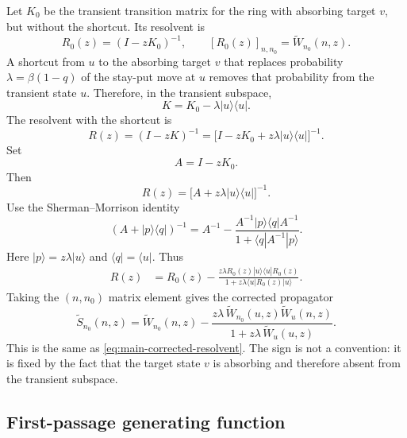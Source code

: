 \documentclass[11pt]{article}
\newcommand{\wt}{\widetilde}
\begin{document}
Let $K_0$ be the transient transition matrix for the ring with absorbing target $v$, but without
the shortcut.  Its resolvent is
\begin{equation}
  R_0(z)=(I-zK_0)^{-1},
  \qquad
  [R_0(z)]_{n,n_0}=\wt W_{n_0}(n,z).
\end{equation}
A shortcut from $u$ to the absorbing target $v$ that replaces probability
$\lambda=\beta(1-q)$ of the stay-put move at $u$ removes that probability from the transient
state $u$.  Therefore, in the transient subspace,
\begin{equation}
  K=K_0-\lambda |u\rangle\langle u|.
  \label{eq:K-with-killing}
\end{equation}
The resolvent with the shortcut is
\begin{equation}
  R(z)=(I-zK)^{-1}=\bigl[I-zK_0+z\lambda |u\rangle\langle u|\bigr]^{-1}.
\end{equation}
Set
\begin{equation}
  A=I-zK_0.
\end{equation}
Then
\begin{equation}
  R(z)=\bigl[A+z\lambda |u\rangle\langle u|\bigr]^{-1}.
\end{equation}
Use the Sherman--Morrison identity
\begin{equation}
  (A+|p\rangle\langle q|)^{-1}
  =A^{-1}-\frac{A^{-1}|p\rangle\langle q|A^{-1}}
  {1+\langle q|A^{-1}|p\rangle}.
\end{equation}
Here $|p\rangle=z\lambda |u\rangle$ and $\langle q|=\langle u|$.  Thus
\begin{align}
  R(z)&=R_0(z)-\frac{z\lambda R_0(z)|u\rangle\langle u|R_0(z)}
  {1+z\lambda\langle u|R_0(z)|u\rangle}.
\end{align}
Taking the $(n,n_0)$ matrix element gives the corrected propagator
\begin{equation}
  \boxed{
  \wt S_{n_0}(n,z)=\wt W_{n_0}(n,z)-
  \frac{z\lambda\,\wt W_{n_0}(u,z)\wt W_u(n,z)}
  {1+z\lambda\,\wt W_u(u,z)}.}
  \label{eq:S-corrected}
\end{equation}
This is the same as \eqref{eq:main-corrected-resolvent}.  The sign is not a convention: it is fixed
by the fact that the target state $v$ is absorbing and therefore absent from the transient
subspace.

\subsection{First-passage generating function}
\end{document}
